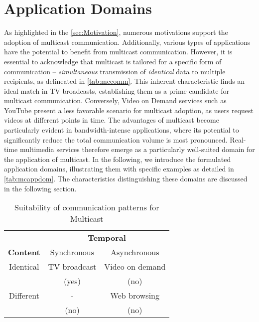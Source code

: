 \section{Application Domains} %
\label{sec:Application Domains}
As highlighted in the \autoref{sec:Motivation}, numerous motivations support
    the adoption of multicast communication.
Additionally, various types of applications have the potential to benefit
    from multicast communication.
However, it is essential to acknowledge that multicast is tailored for a
    specific form of communication -- \textit{simultaneous} transmission of 
    \textit{identical} data to multiple recipients, as delineated in
    \autoref{tab:mccomm}.
This inherent characteristic finds an ideal match in TV broadcasts,
    establishing them as a prime candidate for multicast communication.
Conversely, Video on Demand services such as YouTube present a less favorable
    scenario for multicast adoption, as users request videos at different
    points in time.
The advantages of multicast become particularly evident in bandwidth-intense
    applications, where its potential to significantly reduce the total
    communication volume is most pronounced.
Real-time multimedia services therefore emerge as a particularly well-suited
    domain for the application of multicast.
In the following, we introduce the formulated application domains, illustrating
    them with specific examples as detailed in \autoref{tab:mcappdom}.
The characteristics distinguishing these domains are discussed in the
    following section.

\begin{table}
    \centering
    \begin{tabular}{ccc}
    \toprule
        & \multicolumn{2}{c}{\textbf{Temporal}} \\
        \cmidrule{2-3}
        \textbf{Content} & Synchronous & Asynchronous \\
    \midrule
        Identical & TV broadcast & Video on demand \\
                  & (yes)        & (no) \\
        \addlinespace
        Different & -            & Web browsing \\
                  & (no)         & (no) \\
    \bottomrule
    \end{tabular}
    \caption{Suitability of communication patterns for Multicast}
    \label{tab:mccomm}
\end{table}

